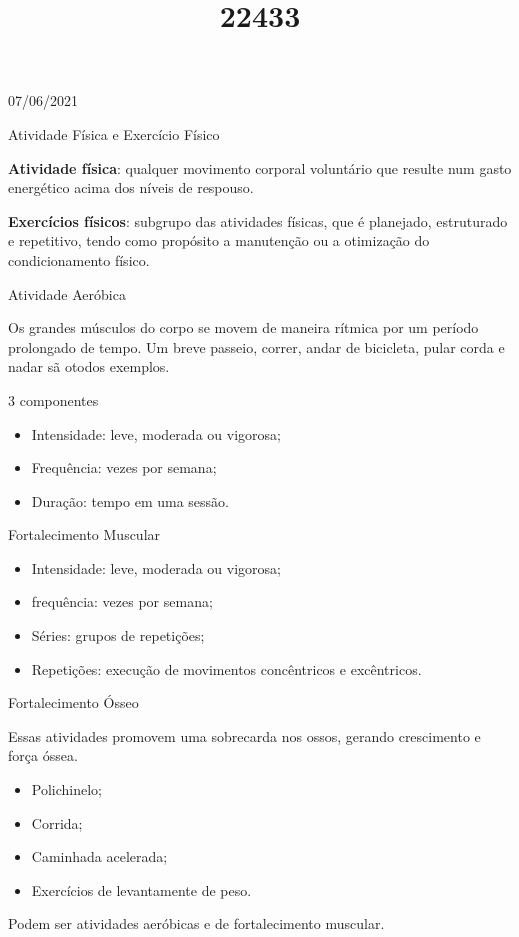 \documentclass{SchoolBook}
\begin{document}
    \begin{day}{07/06/2021}
        \title{2}{Atividade Física e Exercício Físico}
        
        \noindent\textbf{Atividade física}: qualquer movimento corporal voluntário que resulte num gasto energético acima dos níveis de respouso.
        
        \noindent\textbf{Exercícios físicos}: subgrupo das atividades físicas, que é planejado, estruturado e repetitivo, tendo como propósito a manutenção ou a otimização do condicionamento físico.
        
        \title{2}{Atividade Aeróbica}
        
        Os grandes músculos do corpo se movem de maneira rítmica por um período prolongado de tempo. Um breve passeio, correr, andar de bicicleta, pular corda e nadar sã otodos exemplos.
        
        \title{4}{3 componentes}
        \vspace{6pt}
        \begin{itemize}[nosep]
            \item Intensidade: leve, moderada ou vigorosa;
            \item Frequência: vezes por semana;
            \item Duração: tempo em uma sessão.
        \end{itemize}
        
        \title{3}{Fortalecimento Muscular}
        
        \begin{itemize}
            \item Intensidade: leve, moderada ou vigorosa;
            \item frequência: vezes por semana;
            \item Séries: grupos de repetições;
            \item Repetições: execução de movimentos concêntricos e excêntricos.
        \end{itemize}
        
        \title{3}{Fortalecimento Ósseo}
        
        Essas atividades promovem uma sobrecarda nos ossos, gerando crescimento e força óssea.
        
        \vspace{12pt}
        \begin{itemize}[nosep]
            \item Polichinelo;
            \item Corrida;
            \item Caminhada acelerada;
            \item Exercícios de levantamente de peso.
        \end{itemize}
        
        Podem ser atividades aeróbicas e de fortalecimento muscular.
    \end{day}
\end{document}
